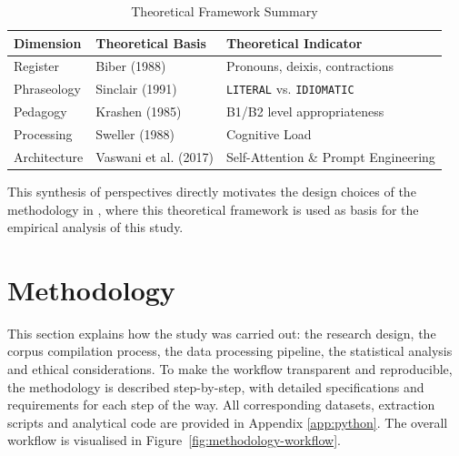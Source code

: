\documentclass[11pt,a4paper]{article}
\begin{document}
\begin{table}[H]
\centering
\caption[Framework Summary]{Theoretical Framework Summary}
\label{tab:framework-summary}
\begin{tabular}{lll}
\toprule
\textbf{Dimension} & \textbf{Theoretical Basis} & \textbf{Theoretical Indicator} \\
\midrule
Register\footnotemark & Biber (1988) & Pronouns, deixis, contractions \\
Phraseology & Sinclair (1991) & \texttt{LITERAL} vs. \texttt{IDIOMATIC} \\
Pedagogy & Krashen (1985) & B1/B2 level appropriateness \\
Processing\footnotemark[\value{footnote}] & Sweller (1988) & Cognitive Load \\
Architecture & Vaswani et al. (2017) & Self-Attention \& Prompt Engineering \\
\bottomrule
\end{tabular}
\end{table}

This synthesis of perspectives directly motivates the design choices of the methodology in , where this theoretical framework is used as basis for the empirical analysis of this study.

\section{Methodology}\label{sec:methodology}\label{Methodology}

This section explains how the study was carried out: the research design, the corpus compilation process, the data processing pipeline, the statistical analysis and ethical considerations. To make the workflow transparent and reproducible, the methodology is described step-by-step, with detailed specifications and requirements for each step of the way. All corresponding datasets, extraction scripts and analytical code are provided in Appendix \ref{app:python}. The overall workflow is visualised in Figure~\ref{fig:methodology-workflow}.
\end{document}
